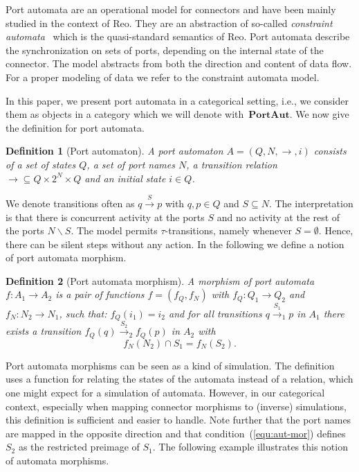 \documentclass[copyright,creativecommons]{eptcs}
\newtheorem{definition}{Definition}
\newcommand{\PA}{\ensuremath{\mathbf{PortAut}}}
\begin{document}
Port automata are an operational model for connectors
and have been mainly studied in the context of Reo.
They are an abstraction of so-called \emph{constraint automata}~\cite{BSAR06}
which is the quasi-standard semantics of Reo.
Port automata describe the synchronization on sets
of ports, depending on the internal state of the connector.
The model abstracts from both the direction and content
of data flow. For a proper modeling of data we refer to the
constraint automata model.

In this paper, we present port automata
in a categorical setting, i.e., we consider
them as objects in a category which we will denote with~\PA.
We now give the definition for port automata.
\vspace{0.2cm}
\begin{definition}[Port automaton] 
A port automaton $A =(Q,N,\to,i)$ consists of a set of states $Q$, 
a set of port names $N$, a transition relation $\to \subseteq Q \times 2^{N}
\times Q$ and an initial state $i \in Q$.
\end{definition}
We denote transitions often as $q\overset{S}{\longrightarrow}p$
with $q,p \in Q$ and $S\subseteq N$. 
The interpretation is that there is concurrent activity
at the ports $S$ and no activity at the rest of the ports $N\backslash S$. 
The model permits $\tau$-transitions, namely whenever $S=\emptyset$. Hence,
there can be silent steps without any action. In the following we define
a notion of port automata morphism.
\vspace{0.2cm}
\begin{definition}[Port automata morphism]
A morphism of port automata $f:A_1 \to A_2$ is a pair of functions $f=(f_Q,f_N)$
with $f_Q: Q_1 \to Q_2$ and $f_N: N_2 \to N_1$, such that: 
$f_Q(i_1)=i_2$ and 
for all transitions $q \overset{S_1}{\longrightarrow}_1 p$ in $A_1$
there exists a transition $f_Q(q) \overset{S_2}{\longrightarrow}_2
f_Q(p)$ in $A_2$ with
\begin{equation}
	\label{equ:aut-mor}
	f_N(N_2) \cap S_1 = f_N(S_2).
\end{equation}
\end{definition}

\vfill

Port automata morphisms can be seen as a kind of simulation.
The definition uses
a function for relating the states of the automata instead of a relation, which
one might expect for a simulation of automata. However, in our categorical
context, especially when mapping connector morphisms to (inverse) simulations,
this definition is sufficient and easier to handle.
Note further that the port names are mapped in the opposite direction and
that condition~(\ref{equ:aut-mor}) defines $S_2$ as the restricted preimage of
$S_1$. The following example illustrates this notion of automata morphisms.
\end{document}
